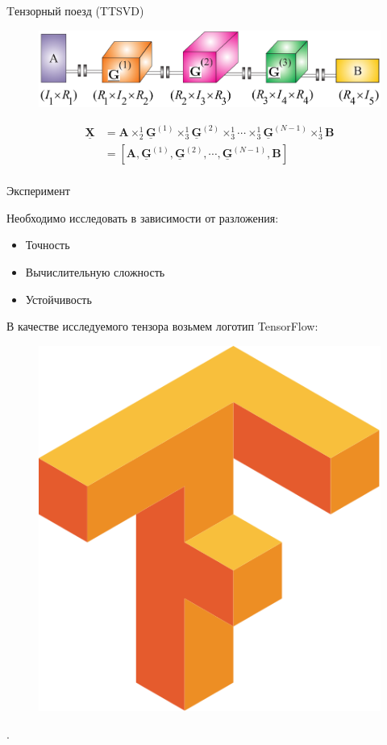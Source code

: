 \documentclass{beamer}
\begin{document}
\begin{frame}{Tензорный поезд (TTSVD)}

    \begin{figure}
        \centering
        \includegraphics[width = \textwidth]{images/TensorTT.png}
    \end{figure}

    \begin{align*}
        \mathbf{\underline{X}} &= \mathbf{A} \times^1_2 \mathbf{\underline{G}}^{(1)} \times^1_3 \mathbf{\underline{G}}^{(2)} \times^1_3 \cdots \times^1_3 \mathbf{\underline{G}}^{(N-1)} \times^1_3 \mathbf{B} \\
        &= \left[ \mathbf{A}, \mathbf{\underline{G}}^{(1)}, \mathbf{\underline{G}}^{(2)}, \cdots, \mathbf{\underline{G}}^{(N-1)}, \mathbf{B} \right]\\
    \end{align*}

\end{frame}


\begin{frame}{Эксперимент}

    Необходимо исследовать в зависимости от разложения:
    \begin{itemize}
        \item Точность
        \item Вычислительную сложность
        \item Устойчивость
    \end{itemize}

    В качестве исследуемого тензора возьмем логотип TensorFlow:

    \begin{figure}
        \centering
        \includegraphics[width = 0.4 \textwidth]{images/Tensorflow_logo.png}
    \end{figure}
.
  
\end{frame}
\end{document}
